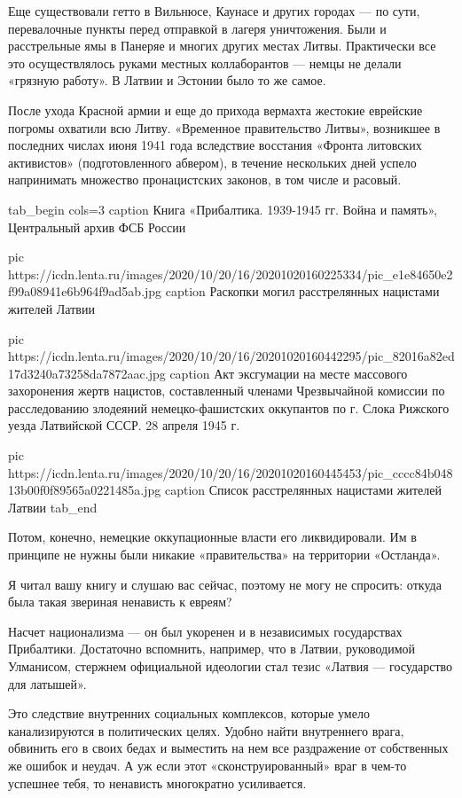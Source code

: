 Еще существовали гетто в Вильнюсе, Каунасе и других городах — по сути,
перевалочные пункты перед отправкой в лагеря уничтожения. Были и расстрельные
ямы в Панеряе и многих других местах Литвы. Практически все это осуществлялось
руками местных коллаборантов — немцы не делали «грязную работу». В Латвии и
Эстонии было то же самое.


После ухода Красной армии и еще до прихода вермахта жестокие еврейские погромы
охватили всю Литву. «Временное правительство Литвы», возникшее в последних
числах июня 1941 года вследствие восстания «Фронта литовских активистов»
(подготовленного абвером), в течение нескольких дней успело напринимать
множество пронацистских законов, в том числе и расовый.

\ifcmt
tab_begin cols=3
	caption Книга «Прибалтика. 1939-1945 гг. Война и память», Центральный архив ФСБ России

	pic https://icdn.lenta.ru/images/2020/10/20/16/20201020160225334/pic_e1e84650e2f99a08941e6b964f9ad5ab.jpg
	caption Раскопки могил расстрелянных нацистами жителей Латвии

	pic https://icdn.lenta.ru/images/2020/10/20/16/20201020160442295/pic_82016a82ed17d3240a73258da7872aac.jpg
	caption Акт эксгумации на месте массового захоронения жертв нацистов, составленный членами Чрезвычайной комиссии по расследованию злодеяний немецко-фашистских оккупантов по г. Слока Рижского уезда Латвийской СССР. 28 апреля 1945 г.

	pic https://icdn.lenta.ru/images/2020/10/20/16/20201020160445453/pic_cccc84b04813b00f0f89565a0221485a.jpg
	caption Список расстрелянных нацистами жителей Латвии
tab_end
\fi

Потом, конечно, немецкие оккупационные власти его ликвидировали. Им в принципе
не нужны были никакие «правительства» на территории «Остланда».

Я читал вашу книгу и слушаю вас сейчас, поэтому не могу не спросить: откуда
была такая звериная ненависть к евреям?

Насчет национализма — он был укоренен и в независимых государствах Прибалтики.
Достаточно вспомнить, например, что в Латвии, руководимой Улманисом, стержнем
официальной идеологии стал тезис «Латвия — государство для латышей».

Это следствие внутренних социальных комплексов, которые умело канализируются в
политических целях. Удобно найти внутреннего врага, обвинить его в своих бедах
и выместить на нем все раздражение от собственных же ошибок и неудач. А уж если
этот «сконструированный» враг в чем-то успешнее тебя, то ненависть многократно
усиливается.

